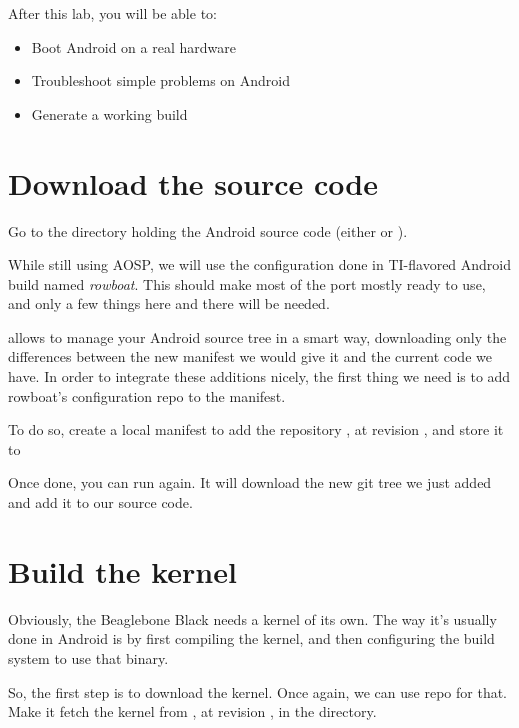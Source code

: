 
After this lab, you will be able to:
\begin{itemize}
  \item Boot Android on a real hardware
  \item Troubleshoot simple problems on Android
  \item Generate a working build
\end{itemize}

\section{Download the source code}

Go to the directory holding the Android source code (either
 or ).

While still using AOSP, we will use the configuration done in
TI-flavored Android build named \emph{rowboat}. This should make most
of the port mostly ready to use, and only a few things here and there
will be needed.

 allows to manage your Android source tree in a smart way,
downloading only the differences between the new manifest we would
give it and the current code we have. In order to integrate these
additions nicely, the first thing we need is to add rowboat's
configuration repo to the manifest.

To do so, create a local manifest to add the repository
,
at revision , and store it to

Once done, you can run  again. It will download the
new git tree we just added and add it to our source code.

\section{Build the kernel}

Obviously, the Beaglebone Black needs a kernel of its own. The way
it's usually done in Android is by first compiling the kernel, and
then configuring the build system to use that binary.

So, the first step is to download the kernel. Once again, we can use
repo for that. Make it fetch the kernel from
, at revision
, in the  directory.

